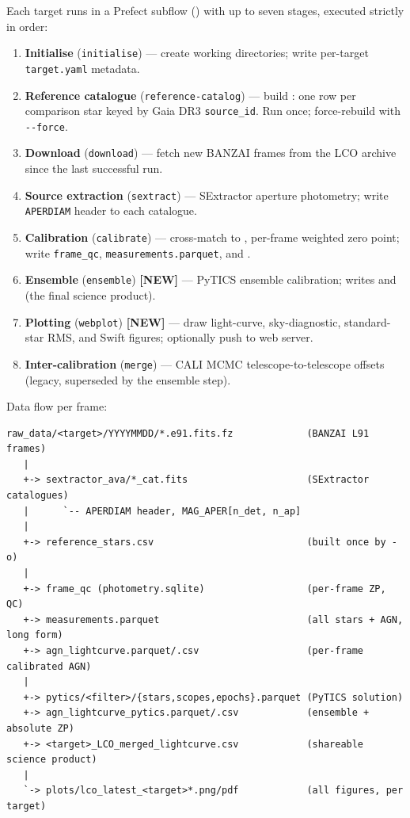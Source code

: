 \documentclass[12pt,a4paper]{article}
\begin{document}
Each target runs in a Prefect subflow () with up
to seven stages, executed strictly in order:

\begin{enumerate}
  \item \textbf{Initialise} (\texttt{initialise}) --- create working
        directories; write per-target \texttt{target.yaml} metadata.
  \item \textbf{Reference catalogue} (\texttt{reference-catalog}) --- build
        : one row per comparison star keyed by
        Gaia DR3 \texttt{source\_id}.  Run once; force-rebuild with
        \texttt{-{}-force}.
  \item \textbf{Download} (\texttt{download}) --- fetch new BANZAI frames from
        the LCO archive since the last successful run.
  \item \textbf{Source extraction} (\texttt{sextract}) --- SExtractor aperture
        photometry; write \texttt{APERDIAM} header to each catalogue.
  \item \textbf{Calibration} (\texttt{calibrate}) --- cross-match to
        , per-frame weighted zero point; write
        \texttt{frame\_qc}, \texttt{measurements.parquet}, and
        .
  \item \textbf{Ensemble} (\texttt{ensemble}) \textbf{[NEW]} --- PyTICS
        ensemble calibration; writes 
        and  (the final science product).
  \item \textbf{Plotting} (\texttt{webplot}) \textbf{[NEW]} --- draw
        light-curve, sky-diagnostic, standard-star RMS, and Swift figures;
        optionally push to web server.
  \item \textbf{Inter-calibration} (\texttt{merge}) --- CALI MCMC
        telescope-to-telescope offsets (legacy, superseded by the ensemble step).
\end{enumerate}

Data flow per frame:
\begin{lstlisting}[style=shell]
raw_data/<target>/YYYYMMDD/*.e91.fits.fz             (BANZAI L91 frames)
   |
   +-> sextractor_ava/*_cat.fits                     (SExtractor catalogues)
   |      `-- APERDIAM header, MAG_APER[n_det, n_ap]
   |
   +-> reference_stars.csv                           (built once by -o)
   |
   +-> frame_qc (photometry.sqlite)                  (per-frame ZP, QC)
   +-> measurements.parquet                          (all stars + AGN, long form)
   +-> agn_lightcurve.parquet/.csv                   (per-frame calibrated AGN)
   |
   +-> pytics/<filter>/{stars,scopes,epochs}.parquet (PyTICS solution)
   +-> agn_lightcurve_pytics.parquet/.csv            (ensemble + absolute ZP)
   +-> <target>_LCO_merged_lightcurve.csv            (shareable science product)
   |
   `-> plots/lco_latest_<target>*.png/pdf            (all figures, per target)
\end{lstlisting}
\end{document}
